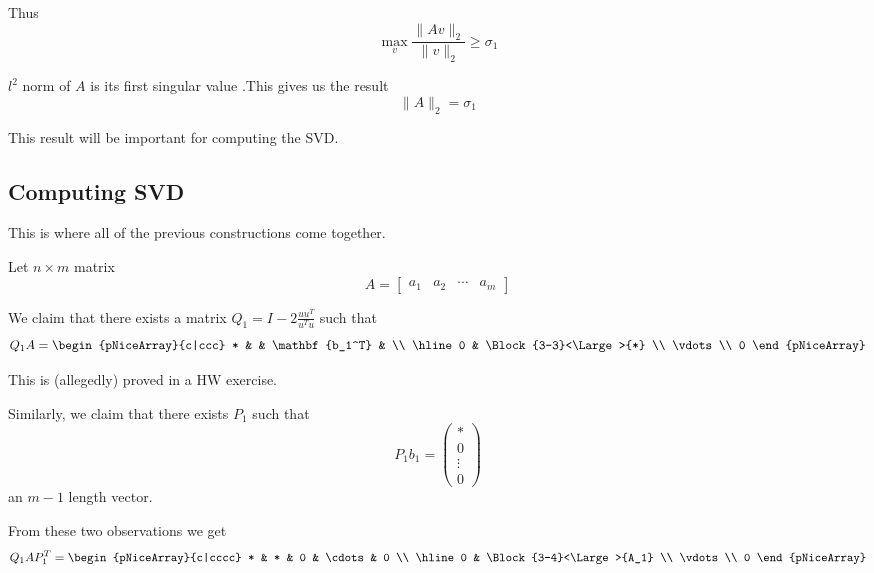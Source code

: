 \documentclass[12pt,letterpaper]{article}
\begin{document}
Thus
\begin{equation}
	\max_v \frac{\lVert Av \rVert_2}{\lVert v \rVert_2} \geq \sigma_1
\end{equation}

\begin{theo}{$l^2$ norm of $A$ is its first singular value}
.This gives us the result
\begin{equation}
	\lVert A \rVert_2 = \sigma_1
\end{equation}
\label{thm:norm_a_sigma_1}
\end{theo}

This result will be important for computing the SVD.

\subsection{Computing SVD}
This is where all of the previous constructions come together.

Let $n \times m$ matrix
\begin{equation}
A = \begin{bmatrix}
	a_1 & a_2 & \cdots & a_m
\end{bmatrix}
\end{equation}

We claim that there exists a matrix $Q_1 = I - 2\frac{uu^T}{u^Tu}$ such that
\begin{equation}
Q_1 A = \begin{pNiceArray}{c|ccc}
	* & & \mathbf{b_1^T} & \\
	\hline
	0 & \Block{3-3}<\Large>{*} \\
	\vdots \\
	0
\end{pNiceArray}
\end{equation}

This is (allegedly) proved in a HW exercise.

Similarly, we claim that there exists $P_1$ such that
\begin{equation}
P_1 b_1 = \begin{pmatrix}
	* \\ 0 \\ \vdots \\ 0
\end{pmatrix}
\end{equation}
an $m-1$ length vector.

From these two observations we get
\begin{equation}
Q_1 A P_1^T = \begin{pNiceArray}{c|cccc}
	* & * & 0 & \cdots & 0 \\
	\hline
	0 & \Block{3-4}<\Large>{A_1} \\
	\vdots \\
	0
\end{pNiceArray}
\end{equation}
\end{document}
